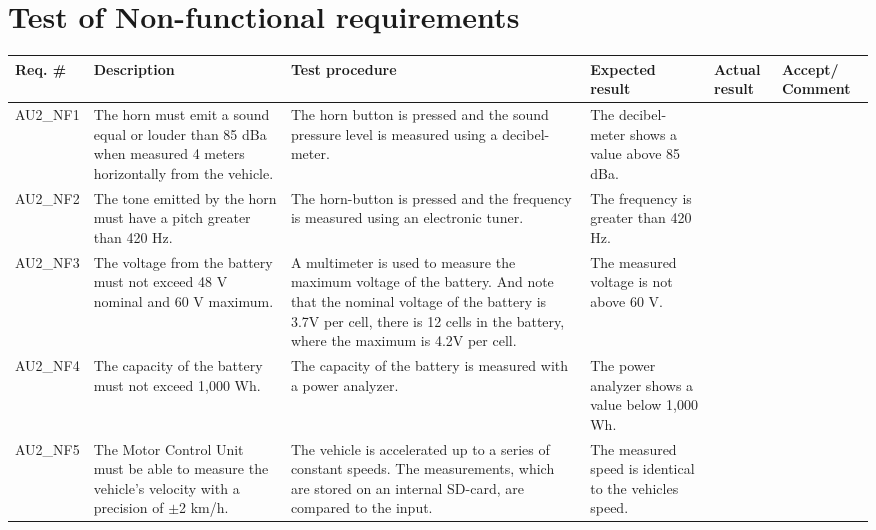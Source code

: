 \pagebreak
\section{Test of Non-functional requirements}

\begin{longtable}{|p{1.7 cm}|p{2.9 cm}|p{2.9 cm}|p{1.9 cm}|p{1.8 cm}|p{1.8 cm}|}
	\hline
	\textbf{Req. \#} & \textbf{Description} & \textbf{Test procedure} & 
	\textbf{Expected result} & \textbf{Actual result} & \textbf{Accept/ Comment} \\ \hline
	\endhead
	AU2\_NF1 
	& The horn must emit a sound equal or louder than 85 dBa when measured 4 meters horizontally from the vehicle.
	& The horn button is pressed and the sound pressure level is measured using a decibel-meter.
	& The decibel-meter shows a value above 85 dBa.
	& 
	& \\ \hline
	AU2\_NF2
	& The tone emitted by the horn must have a pitch greater than 420 Hz.
	& The horn-button is pressed and the frequency is measured using an electronic tuner.
	& The frequency is greater than 420 Hz.
	& 
	& \\ \hline
	AU2\_NF3
	& The voltage from the battery must not exceed 48 V nominal and 60 V maximum.
	& A multimeter is used to measure the maximum voltage of the battery. And note that the nominal voltage of the battery is 3.7V per cell, there is 12 cells in the battery, where the maximum is 4.2V per cell. 
	& The measured voltage is not above 60 V.
	& 
	& \\ \hline
	AU2\_NF4
	& The capacity of the battery must not exceed 1,000 Wh.
	& The capacity of the battery is measured with a power analyzer.
	& The power analyzer shows a value below 1,000 Wh.
	& 
	& \\ \hline
	AU2\_NF5
	& The Motor Control Unit must be able to measure the vehicle's velocity with a precision of $\pm$2 km/h.
	& The vehicle is accelerated up to a series of constant speeds. The measurements, which are stored on an internal SD-card, are compared to the input.
	& The measured speed is identical to the vehicles speed.
	& 
	& \\ \hline			
\end{longtable}